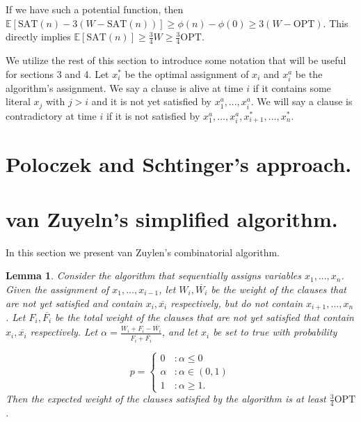 \documentclass[11pt,letter]{article}
\newtheorem{lemma}{Lemma}
\begin{document}
If we have such a potential function, then $\mathbb{E}[\text{SAT}(n)- 3\left(W-\text{SAT}(n)\right)] \geq \phi(n) - \phi(0) \geq 3(W-\text{OPT})$.
This directly implies $\mathbb{E}[\text{SAT}(n)] \geq \frac{3}{4} W \geq \frac{3}{4} \text{OPT}$. 

We utilize the rest of this section to introduce some notation that will be useful for sections 3 and 4. 
Let $x_i^*$ be the optimal assignment of $x_i$ and $x_i^{a}$ be the algorithm's assignment. We say a clause is alive 
at time $i$ if it contains some literal $x_j$ with $j > i$ and it is not yet satisfied by $x_1^a,...,x_i^a$. 
We will say a clause is contradictory at time $i$ if it is not satisfied by $x_1^a,...,x_i^a,x_{i+1}^*,...,x_n^*$. 

\section{Poloczek and Schtinger's approach.}
\section{van Zuyeln's simplified algorithm.}

In this section we present van Zuylen's combinatorial algorithm. 

\begin{lemma}
Consider the algorithm that sequentially assigns variables $x_1,...,x_n$. Given the assignment of $x_1,...,x_{i-1}$,
 let $W_i, \overline{W_i}$ be the weight of the clauses that are not yet satisfied and contain $x_i, \overline{x_i}$ respectively,
 but do not contain $x_{i+1}, ..., x_n$. Let $F_i, \overline{F_i}$ be the total weight of the clauses that are not yet satisfied 
 that contain $x_i, \overline{x_i}$ respectively. Let $\alpha = \frac{W_i + F_i - \overline{W_i}}{F_i + \overline{F_i}}$, and let $x_i$ be set to true with probability 

\begin{displaymath}
  p = \left\{
     \begin{array}{lr}
       0 & : \alpha \leq 0\\
       \alpha & : \alpha \in (0,1) \\ 
       1 & : \alpha \geq 1.
     \end{array}
   \right.
\end{displaymath}  
Then the expected weight of the clauses satisfied by the algorithm is at least $\frac{3}{4} \text{OPT}$. 
\end{lemma} 
\end{document}
